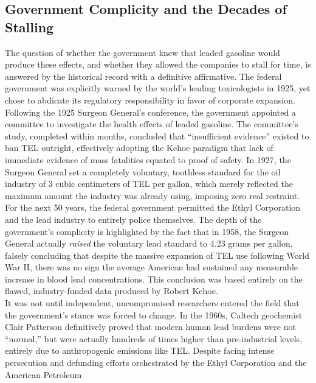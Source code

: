 \documentclass[
]{article}
\begin{document}
\subsection{\texorpdfstring{\textbf{Government Complicity and the
Decades of
Stalling}}{Government Complicity and the Decades of Stalling}}\label{government-complicity-and-the-decades-of-stalling}

The question of whether the government knew that leaded gasoline would
produce these effects, and whether they allowed the companies to stall
for time, is answered by the historical record with a definitive
affirmative. The federal government was explicitly warned by the world's
leading toxicologists in 1925, yet chose to abdicate its regulatory
responsibility in favor of corporate expansion.\\
Following the 1925 Surgeon General's conference, the government
appointed a committee to investigate the health effects of leaded
gasoline. The committee's study, completed within months, concluded that
``insufficient evidence'' existed to ban TEL outright, effectively
adopting the Kehoe paradigm that lack of immediate evidence of mass
fatalities equated to proof of safety. In 1927, the Surgeon General set
a completely voluntary, toothless standard for the oil industry of 3
cubic centimeters of TEL per gallon, which merely reflected the maximum
amount the industry was already using, imposing zero real restraint.\\
For the next 50 years, the federal government permitted the Ethyl
Corporation and the lead industry to entirely police themselves. The
depth of the government's complicity is highlighted by the fact that in
1958, the Surgeon General actually \emph{raised} the voluntary lead
standard to 4.23 grams per gallon, falsely concluding that despite the
massive expansion of TEL use following World War II, there was no sign
the average American had sustained any measurable increase in blood lead
concentrations. This conclusion was based entirely on the flawed,
industry-funded data produced by Robert Kehoe.\\
It was not until independent, uncompromised researchers entered the
field that the government's stance was forced to change. In the 1960s,
Caltech geochemist Clair Patterson definitively proved that modern human
lead burdens were not ``normal,'' but were actually hundreds of times
higher than pre-industrial levels, entirely due to anthropogenic
emissions like TEL. Despite facing intense persecution and defunding
efforts orchestrated by the Ethyl Corporation and the American Petroleum
\end{document}
